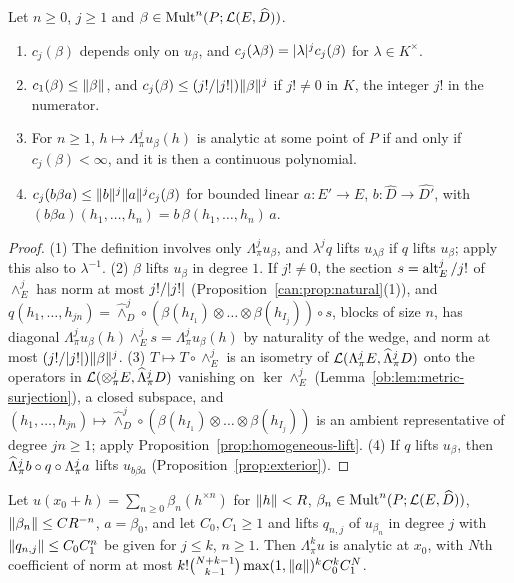 \begin{lemma}\label{fmo:lem:homogeneous}
Let $n\ge0$, $j\ge1$ and $\beta\in\operatorname{Mult}^n(P;\mathcal L(E,\widehat D))$.
\begin{enumerate}
\item $c_j(\beta)$ depends only on $u_\beta$, and $c_j(\lambda\beta)=\lvert \lambda\rvert^jc_j(\beta)$ for $\lambda\in K^\times$.
\item $c_1(\beta)\le\lVert \beta\rVert$, and $c_j(\beta)\le(j!/\lvert j!\rvert)\lVert \beta\rVert^j$ if $j!\ne0$ in $K$, the integer $j!$ in the
numerator.
\item For $n\ge1$, $h\mapsto\Lambda^j_\pi u_\beta(h)$ is analytic at some point of $P$ if and only if $c_j(\beta)<\infty$,
and it is then a continuous polynomial.
\item $c_j(b\beta a)\le\lVert b\rVert^j\lVert a\rVert^jc_j(\beta)$ for bounded linear $a\colon E'\to E$, $b\colon\widehat D\to\widehat{D'}$,
with $(b\beta a)(h_1,\allowbreak\dots,h_n)=b\,\beta(h_1,\allowbreak\dots,h_n)\,a$.
\end{enumerate}
\end{lemma}

\begin{proof}
(1) The definition involves only $\Lambda^j_\pi u_\beta$, and $\lambda^jq$ lifts $u_{\lambda\beta}$ if $q$ lifts $u_\beta$;
apply this also to $\lambda^{-1}$. (2) $\beta$ lifts $u_\beta$ in degree $1$. If $j!\ne0$, the section $s=\operatorname{alt}^j_E/j!$
of $\wedge^j_E$ has norm at most
$j!/\lvert j!\rvert$ (Proposition~\ref{can:prop:natural}(1)), and $q(h_1,\dots,h_{jn})=\widehat\wedge^j_D\circ(\beta(h_{I_1})\otimes
\dots\otimes\beta(h_{I_j}))\circ s$, blocks of size $n$, has diagonal $\Lambda^j_\pi u_\beta(h)\wedge^j_Es=
\Lambda^j_\pi u_\beta(h)$ by naturality of the wedge, and norm at most $(j!/\lvert j!\rvert)\lVert \beta\rVert^j$. (3) $T\mapsto
T\circ\wedge^j_E$ is an isometry of
$\mathcal L(\Lambda^j_\pi E,\widehat\Lambda^j_\pi D)$ onto the operators in $\mathcal L(\otimes^j_\pi E,\widehat\Lambda^j_\pi D)$ vanishing on
$\ker\wedge^j_E$ (Lemma~\ref{ob:lem:metric-surjection}), a closed subspace, and $(h_1,\dots,h_{jn})\mapsto
\widehat\wedge^j_D\circ(\beta(h_{I_1})\otimes\dots\otimes\beta(h_{I_j}))$ is an ambient representative of degree $jn\ge1$;
apply Proposition~\ref{prop:homogeneous-lift}. (4) If $q$ lifts $u_\beta$, then $\widehat\Lambda^j_\pi b\circ q\circ\Lambda^j_\pi a$
lifts $u_{b\beta a}$ (Proposition~\ref{prop:exterior}).
\end{proof}

\begin{lemma}\label{fmo:lem:assembly}
Let $u(x_0+h)=\sum_{n\ge0}\beta_n(h^{\times n})$ for $\lVert h\rVert<R$, $\beta_n\in\operatorname{Mult}^n(P;\mathcal L(E,\widehat D))$,
$\lVert \beta_n\rVert\le CR^{-n}$, $a=\beta_0$, and let $C_0,C_1\ge1$ and lifts $q_{n,j}$ of $u_{\beta_n}$ in degree $j$ with
$\lVert q_{n,j}\rVert\le C_0C_1^n$ be given for $j\le k$, $n\ge1$. Then $\Lambda^k_\pi u$ is analytic at $x_0$, with $N$th
coefficient of norm at most $k!\binom{N+k-1}{k-1}\max(1,\lVert a\rVert)^kC_0^kC_1^N$.
\end{lemma}

